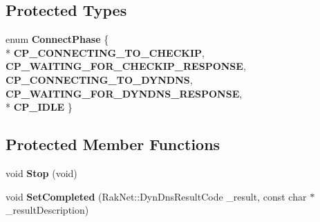 \subsection*{Protected Types}
\begin{DoxyCompactItemize}
\item 
enum {\bfseries Connect\-Phase} \{ \\*
{\bfseries C\-P\-\_\-\-C\-O\-N\-N\-E\-C\-T\-I\-N\-G\-\_\-\-T\-O\-\_\-\-C\-H\-E\-C\-K\-I\-P}, 
{\bfseries C\-P\-\_\-\-W\-A\-I\-T\-I\-N\-G\-\_\-\-F\-O\-R\-\_\-\-C\-H\-E\-C\-K\-I\-P\-\_\-\-R\-E\-S\-P\-O\-N\-S\-E}, 
{\bfseries C\-P\-\_\-\-C\-O\-N\-N\-E\-C\-T\-I\-N\-G\-\_\-\-T\-O\-\_\-\-D\-Y\-N\-D\-N\-S}, 
{\bfseries C\-P\-\_\-\-W\-A\-I\-T\-I\-N\-G\-\_\-\-F\-O\-R\-\_\-\-D\-Y\-N\-D\-N\-S\-\_\-\-R\-E\-S\-P\-O\-N\-S\-E}, 
\\*
{\bfseries C\-P\-\_\-\-I\-D\-L\-E}
 \}
\end{DoxyCompactItemize}
\subsection*{Protected Member Functions}
\begin{DoxyCompactItemize}
\item 
\hypertarget{class_rak_net_1_1_dyn_d_n_s_a3801e2e93ee73afc2971b9a57bcd12e2}{void {\bfseries Stop} (void)}\label{class_rak_net_1_1_dyn_d_n_s_a3801e2e93ee73afc2971b9a57bcd12e2}

\item 
\hypertarget{class_rak_net_1_1_dyn_d_n_s_a171f091495fad27f258aac182a82bfe5}{void {\bfseries Set\-Completed} (Rak\-Net\-::\-Dyn\-Dns\-Result\-Code \-\_\-result, const char $\ast$\-\_\-result\-Description)}\label{class_rak_net_1_1_dyn_d_n_s_a171f091495fad27f258aac182a82bfe5}

\end{DoxyCompactItemize}

